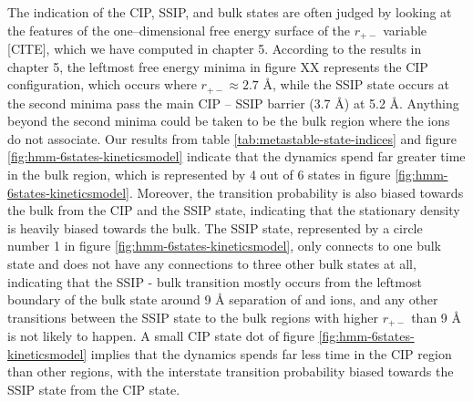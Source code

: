 \begin{spacing}{2.0}
    The indication of the CIP, SSIP, and bulk states are often judged by looking at the features of the one--dimensional free energy surface of 
    the $r_{+-}$ variable [CITE], which we have computed in chapter 5. According to the results in chapter 5, the leftmost free energy minima in 
    figure XX represents the CIP configuration, which occurs where $r_{+-} \approx 2.7$ \r{A}, while the SSIP state occurs at the second minima 
    pass the main CIP -- SSIP barrier (3.7 \r{A}) at 5.2 \r{A}. Anything beyond the second minima could be taken to be the bulk region where the 
    ions do not associate. Our results from table \ref{tab:metastable-state-indices} and figure \ref{fig:hmm-6states-kineticsmodel} indicate that 
    the dynamics spend far greater time in the bulk region, which is represented by 4 out of 6 states in figure \ref{fig:hmm-6states-kineticsmodel}. 
    Moreover, the transition probability is also biased towards the bulk from the CIP and the SSIP state, indicating that the stationary density is 
    heavily biased towards the bulk. The SSIP state, represented by a circle number 1 in figure \ref{fig:hmm-6states-kineticsmodel}, only connects 
    to one bulk state and does not have any connections to three other bulk states at all, indicating that the SSIP - bulk transition mostly occurs 
    from the leftmost boundary of the bulk state around 9 \r{A} separation of  and  ions, and any other transitions between the 
    SSIP state to the bulk regions with higher $r_{+-}$ than 9 \r{A} is not likely to happen. A small CIP state dot of figure 
    \ref{fig:hmm-6states-kineticsmodel} implies that the dynamics spends far less time in the CIP region than other regions, with the interstate 
    transition probability biased towards the SSIP state from the CIP state.


\end{spacing}
